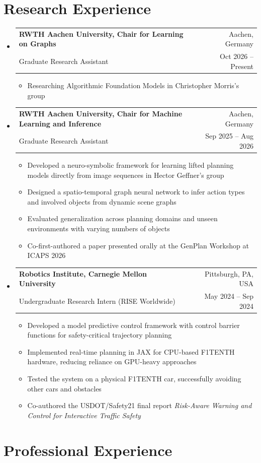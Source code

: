 \documentclass[letterpaper,11pt]{article}
\makeatletter
\newcommand{\resumeItem}[1]{
  \item\small{
    {#1 \vspace{-3pt}}
  }
}
\newcommand{\resumeSubheading}[4]{
  \vspace{-2pt}\item
    \begin{tabular*}{0.97\textwidth}[t]{l@{\extracolsep{\fill}}r}
      #1 & #2 \\
      \small#3 & \small#4
    \end{tabular*}\vspace{-8pt}
}
\newcommand{\resumeSubHeadingListStart}{\begin{itemize}[leftmargin=0.15in, label={}]}
\newcommand{\resumeSubHeadingListEnd}{\end{itemize}}
\newcommand{\resumeItemListStart}{\begin{itemize}}
\newcommand{\resumeItemListEnd}{\end{itemize}\vspace{-7pt}}
\makeatother
\begin{document}
\section{Research Experience}

\resumeSubHeadingListStart

\resumeSubheading
  {\textbf{RWTH Aachen University, Chair for Learning on Graphs}}{Aachen, Germany}
  {Graduate Research Assistant}{Oct 2026 -- Present}
  \resumeItemListStart
      \resumeItem{Researching Algorithmic Foundation Models in Christopher Morris's group}
  \resumeItemListEnd

\resumeSubheading
  {\textbf{RWTH Aachen University, Chair for Machine Learning and Inference}}{Aachen, Germany}
  {Graduate Research Assistant}{Sep 2025 -- Aug 2026}
  \resumeItemListStart
        \resumeItem{Developed a neuro-symbolic framework for learning lifted planning models directly from image sequences in Hector Geffner's group}
        \resumeItem{Designed a spatio-temporal graph neural network to infer action types and involved objects from dynamic scene graphs}
        \resumeItem{Evaluated generalization across planning domains and unseen environments with varying numbers of objects}
        \resumeItem{Co-first-authored a paper presented orally at the GenPlan Workshop at ICAPS 2026}
  \resumeItemListEnd

\resumeSubheading
    {\textbf{Robotics Institute, Carnegie Mellon University}}{Pittsburgh, PA, USA}
    {Undergraduate Research Intern (RISE Worldwide)}{May 2024 -- Sep 2024}
\resumeItemListStart
    \resumeItem{Developed a model predictive control framework with control barrier functions for safety-critical trajectory planning}
    \resumeItem{Implemented real-time planning in JAX for CPU-based F1TENTH hardware, reducing reliance on GPU-heavy approaches}
    \resumeItem{Tested the system on a physical F1TENTH car, successfully avoiding other cars and obstacles}
    \resumeItem{Co-authored the USDOT/Safety21 final report \textit{Risk-Aware Warning and Control for Interactive Traffic Safety} \href{https://scholar.google.com/citations?view_op=view_citation\&hl=de\&user=elk9fuYAAAAJ\&citation_for_view=elk9fuYAAAAJ:qjMakFHDy7sC}{\faExternalLink}}
\resumeItemListEnd
\resumeSubHeadingListEnd

\section{Professional Experience}
\end{document}
